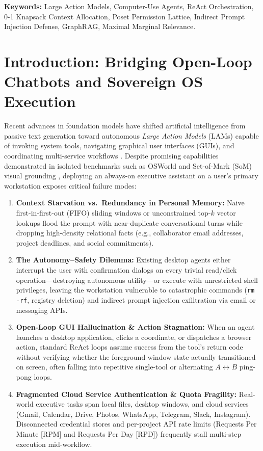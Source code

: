 \documentclass[10pt,a4paper]{article}
\begin{document}
\vspace{2pt}
\noindent\textbf{Keywords:} Large Action Models, Computer-Use Agents, ReAct Orchestration, 0-1 Knapsack Context Allocation, Poset Permission Lattice, Indirect Prompt Injection Defense, GraphRAG, Maximal Marginal Relevance.

\section{Introduction: Bridging Open-Loop Chatbots and Sovereign OS Execution}

Recent advances in foundation models have shifted artificial intelligence from passive text generation toward autonomous \textit{Large Action Models} (LAMs) capable of invoking system tools, navigating graphical user interfaces (GUIs), and coordinating multi-service workflows \cite{yao2023react,xie2024osworld,agashe2024agents}. Despite promising capabilities demonstrated in isolated benchmarks such as OSWorld \cite{xie2024osworld} and Set-of-Mark (SoM) visual grounding \cite{yang2023som}, deploying an always-on executive assistant on a user's primary workstation exposes critical failure modes:

\begin{enumerate}\setlength{\itemsep}{2pt}\setlength{\parskip}{0pt}
    \item \textbf{Context Starvation vs.\ Redundancy in Personal Memory:} Naive first-in-first-out (FIFO) sliding windows or unconstrained top-$k$ vector lookups flood the prompt with near-duplicate conversational turns while dropping high-density relational facts (e.g., collaborator email addresses, project deadlines, and social commitments).
    \item \textbf{The Autonomy--Safety Dilemma:} Existing desktop agents either interrupt the user with confirmation dialogs on every trivial read/click operation---destroying autonomous utility---or execute with unrestricted shell privileges, leaving the workstation vulnerable to catastrophic commands (\texttt{rm -rf}, registry deletion) and indirect prompt injection exfiltration via email or messaging APIs.
    \item \textbf{Open-Loop GUI Hallucination \& Action Stagnation:} When an agent launches a desktop application, clicks a coordinate, or dispatches a browser action, standard ReAct loops \cite{yao2023react} assume success from the tool's return code without verifying whether the foreground window state actually transitioned on screen, often falling into repetitive single-tool or alternating $A \leftrightarrow B$ ping-pong loops.
    \item \textbf{Fragmented Cloud Service Authentication \& Quota Fragility:} Real-world executive tasks span local files, desktop windows, and cloud services (Gmail, Calendar, Drive, Photos, WhatsApp, Telegram, Slack, Instagram). Disconnected credential stores and per-project API rate limits (Requests Per Minute [RPM] and Requests Per Day [RPD]) frequently stall multi-step execution mid-workflow.
\end{enumerate}
\end{document}
